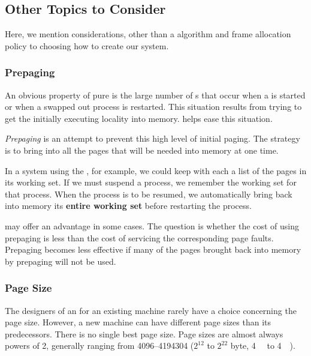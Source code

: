 \subsection{Other Topics to Consider}\label{subsec:Other_Topics_to_Consider}
Here, we mention considerations, other than a  algorithm and frame allocation policy to choosing how to create our  system.

\subsubsection{Prepaging}\label{subsubsec:Prepaging}
An obvious property of pure  is the large number of s that occur when a  is started or when a swapped out process is restarted.
This situation results from trying to get the initially executing locality into memory.
 helps ease this situation.

\begin{definition}[Prepaging]\label{def:Prepaging}
  \emph{Prepaging} is an attempt to prevent this high level of initial paging.
  The strategy is to bring into all the pages that will be needed into memory at one time.
\end{definition}

In a system using the , for example, we could keep with each  a list of the pages in its working set.
If we must suspend a process, we remember the working set for that process.
When the process is to be resumed, we automatically bring back into memory its \textbf{entire working set} before restarting the process.

 may offer an advantage in some cases.
The question is whether the cost of using prepaging is less than the cost of servicing the corresponding page faults.
Prepaging becomes less effective if many of the pages brought back into memory by prepaging will not be used.

\subsubsection{Page Size}\label{subsubsec:Page_Size}
The designers of an  for an existing machine rarely have a choice concerning the page size.
However, a new machine can have different page sizes than its predecessors.
There is no single best page size.
Page sizes are almost always powers of 2, generally ranging from \SIrange{4096}{4194304}{\byte{}} ($2^{12}$ to $2^{22}$ byte, \SI{4}{\kibi{} \byte{}} to \SI{4}{\mebi{} \byte{}}).

